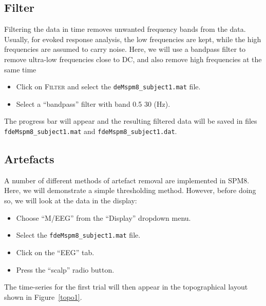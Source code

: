 \subsection{Filter}
Filtering the data in time removes unwanted frequency bands from the data. Usually, for evoked response analysis, the low frequencies are kept, while the high frequencies are assumed to carry noise. Here, we will use a bandpass filter to remove ultra-low frequencies close to DC, and also remove high frequencies at the same time
\begin{itemize}
\item{Click on \textsc{Filter} and select the \texttt{deMspm8\_subject1.mat} file.}
\item{Select a ``bandpass'' filter with band 0.5 30 (Hz).}
\end{itemize}
The progress bar will appear and the resulting filtered data will be saved in files \texttt{fdeMspm8\_subject1.mat} and \texttt{fdeMspm8\_subject1.dat}.

\subsection{Artefacts}
 A number of different methods of artefact removal are implemented in SPM8. Here, we will demonstrate a simple thresholding method. However, before doing so, we will look at the data in the display:
\begin{itemize}
\item{Choose ``M/EEG'' from the ``Display'' dropdown menu.}
\item{Select the \texttt{fdeMspm8\_subject1.mat} file.}
\item{Click on the ``EEG'' tab.}
\item{Press the ``scalp'' radio button.}
\end{itemize}
The time-series for the first trial will then appear in the topographical layout shown in Figure~\ref{topo1}.

